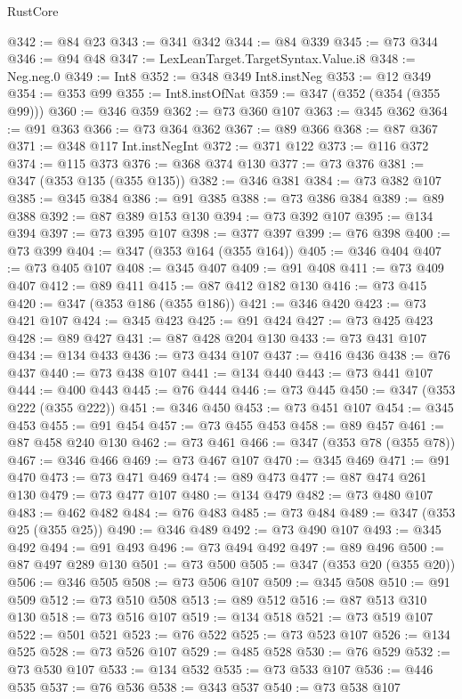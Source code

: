 \begin{lexlean}{RustCore}
\begin{coremodule}
@342 := @84 @23
@343 := @341 @342
@344 := @84 @339
@345 := @73 @344
@346 := @94 @48
@347 := LexLeanTarget.TargetSyntax.Value.i8
@348 := Neg.neg.{0}
@349 := Int8
@352 := @348 @349 Int8.instNeg
@353 := @12 @349
@354 := @353 @99
@355 := Int8.instOfNat
@359 := @347 (@352 (@354 (@355 @99)))
@360 := @346 @359
@362 := @73 @360 @107
@363 := @345 @362
@364 := @91 @363
@366 := @73 @364 @362
@367 := @89 @366
@368 := @87 @367
@371 := @348 @117 Int.instNegInt
@372 := @371 @122
@373 := @116 @372
@374 := @115 @373
@376 := @368 @374 @130
@377 := @73 @376
@381 := @347 (@353 @135 (@355 @135))
@382 := @346 @381
@384 := @73 @382 @107
@385 := @345 @384
@386 := @91 @385
@388 := @73 @386 @384
@389 := @89 @388
@392 := @87 @389 @153 @130
@394 := @73 @392 @107
@395 := @134 @394
@397 := @73 @395 @107
@398 := @377 @397
@399 := @76 @398
@400 := @73 @399
@404 := @347 (@353 @164 (@355 @164))
@405 := @346 @404
@407 := @73 @405 @107
@408 := @345 @407
@409 := @91 @408
@411 := @73 @409 @407
@412 := @89 @411
@415 := @87 @412 @182 @130
@416 := @73 @415
@420 := @347 (@353 @186 (@355 @186))
@421 := @346 @420
@423 := @73 @421 @107
@424 := @345 @423
@425 := @91 @424
@427 := @73 @425 @423
@428 := @89 @427
@431 := @87 @428 @204 @130
@433 := @73 @431 @107
@434 := @134 @433
@436 := @73 @434 @107
@437 := @416 @436
@438 := @76 @437
@440 := @73 @438 @107
@441 := @134 @440
@443 := @73 @441 @107
@444 := @400 @443
@445 := @76 @444
@446 := @73 @445
@450 := @347 (@353 @222 (@355 @222))
@451 := @346 @450
@453 := @73 @451 @107
@454 := @345 @453
@455 := @91 @454
@457 := @73 @455 @453
@458 := @89 @457
@461 := @87 @458 @240 @130
@462 := @73 @461
@466 := @347 (@353 @78 (@355 @78))
@467 := @346 @466
@469 := @73 @467 @107
@470 := @345 @469
@471 := @91 @470
@473 := @73 @471 @469
@474 := @89 @473
@477 := @87 @474 @261 @130
@479 := @73 @477 @107
@480 := @134 @479
@482 := @73 @480 @107
@483 := @462 @482
@484 := @76 @483
@485 := @73 @484
@489 := @347 (@353 @25 (@355 @25))
@490 := @346 @489
@492 := @73 @490 @107
@493 := @345 @492
@494 := @91 @493
@496 := @73 @494 @492
@497 := @89 @496
@500 := @87 @497 @289 @130
@501 := @73 @500
@505 := @347 (@353 @20 (@355 @20))
@506 := @346 @505
@508 := @73 @506 @107
@509 := @345 @508
@510 := @91 @509
@512 := @73 @510 @508
@513 := @89 @512
@516 := @87 @513 @310 @130
@518 := @73 @516 @107
@519 := @134 @518
@521 := @73 @519 @107
@522 := @501 @521
@523 := @76 @522
@525 := @73 @523 @107
@526 := @134 @525
@528 := @73 @526 @107
@529 := @485 @528
@530 := @76 @529
@532 := @73 @530 @107
@533 := @134 @532
@535 := @73 @533 @107
@536 := @446 @535
@537 := @76 @536
@538 := @343 @537
@540 := @73 @538 @107

\end{coremodule}
\end{lexlean}
